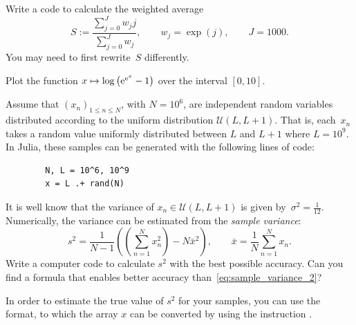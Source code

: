 \begin{compexercise}
    Write a code to calculate the weighted average
    \[
        S := \frac
        {\sum_{j=0}^{J} w_j j}
        {\sum_{j=0}^{J} w_j},
        \qquad w_j = \exp(j),
        \qquad J = 1000.
    \]
    You may need to first rewrite~$S$ differently.
\end{compexercise}

\begin{compexercise}
    Plot the function $x \mapsto \log\left(\mathrm e^{\mathrm e^x} - 1\right)$ over the interval $[0, 10]$.
\end{compexercise}

\begin{compexercise}
    Assume that $(x_n)_{1 \leq n \leq N}$, with $N = 10^6$, are independent random variables distributed according to
    the uniform distribution $\mathcal U(L, L+1)$.
    That is, each~$x_n$ takes a random value uniformly distributed between $L$ and $L+1$ where $L = 10^9$.
    In Julia, these samples can be generated with the following lines of code:
    \begin{verbatim}
        N, L = 10^6, 10^9
        x = L .+ rand(N)
    \end{verbatim}
    It is well know that the variance of $x_n \in \mathcal U(L, L+1)$ is given by~$\sigma^2 = \frac{1}{12}$.
    Numerically, the variance can be estimated from the \emph{sample variance}:
    \begin{equation}
        \label{eq:sample_variance_2}
        s^2 = \frac{1}{N-1} \left(\left(\sum_{n=1}^{N} x_n^2\right) - N \bar x^2 \right),
        \qquad \bar x = \frac{1}{N} \sum_{n=1}^{N} x_n.
    \end{equation}
    Write a computer code to calculate $s^2$ with the best possible accuracy.
    Can you find a formula that enables better accuracy than~\eqref{eq:sample_variance_2}?
\end{compexercise}

\begin{remark}
    In order to estimate the true value of $s^2$ for your samples,
    you can use the  format,
    to which the array $x$ can be converted by using the instruction .
\end{remark}

